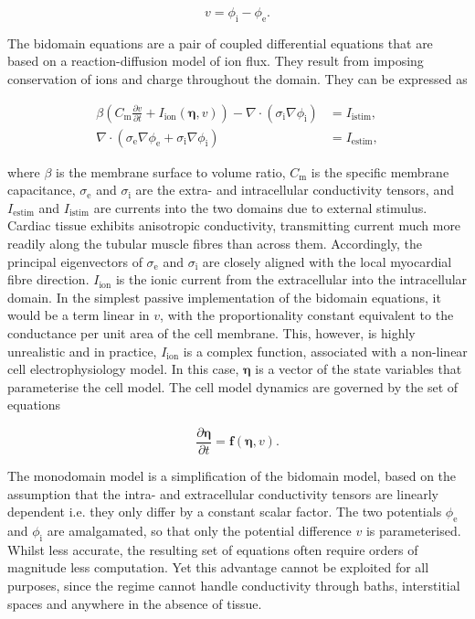   \begin{equation}
    v = \phi_\text{i} - \phi_\text{e}.
  \end{equation}
  
  The bidomain equations are a pair of coupled differential equations that are based on a reaction-diffusion model of ion flux. They result from imposing conservation of ions and charge throughout the domain. They can be expressed as
  
  \begin{align}
    \beta \left( C_\text{m}\frac{\partial v}{\partial t} + I_\text{ion}\left( \boldsymbol\eta, v \right) \right) - \nabla \cdot \left( \sigma_\text{i} \nabla \phi_\text{i} \right) &= I_\text{istim}, \\
      \nabla \cdot \left( \sigma_\text{e} \nabla \phi_\text{e} +  \sigma_\text{i} \nabla \phi_\text{i} \right) &= I_\text{estim},
  \end{align} 
  
  where $\beta$ is the membrane surface to volume ratio, $C_\text{m}$ is the specific membrane capacitance, $\sigma_\text{e}$ and $\sigma_\text{i}$ are the extra- and intracellular conductivity tensors, and $I_\text{estim}$ and $I_\text{istim}$ are currents into the two domains due to external stimulus. Cardiac tissue exhibits anisotropic conductivity, transmitting current much more readily along the tubular muscle fibres than across them. Accordingly, the principal eigenvectors of $\sigma_\text{e}$ and $\sigma_\text{i}$ are closely aligned with the local myocardial fibre direction. $I_\text{ion}$ is the ionic current from the extracellular into the intracellular domain. In the simplest passive implementation of the bidomain equations, it would be a term linear in $v$, with the proportionality constant equivalent to the conductance per unit area of the cell membrane. This, however, is highly unrealistic and in practice, $I_\text{ion}$ is a complex function, associated with a non-linear cell electrophysiology model. In this case, $\boldsymbol\eta$ is a vector of the state variables that parameterise the cell model. The cell model dynamics are governed by the set of equations
  
  \begin{equation}
    \frac{\partial \boldsymbol\eta}{\partial t} = \mathbf{f}\left(\boldsymbol\eta, v \right).
  \end{equation}
  
  The monodomain model is a simplification of the bidomain model, based on the assumption that the intra- and extracellular conductivity tensors are linearly dependent i.e. they only differ by a constant scalar factor. The two potentials $\phi_\text{e}$ and $\phi_\text{i}$ are amalgamated, so that only the potential difference $v$ is parameterised. Whilst less accurate, the resulting set of equations often require orders of magnitude less computation. Yet this advantage cannot be exploited for all purposes, since the regime cannot handle conductivity through baths, interstitial spaces and anywhere in the absence of tissue.
  
